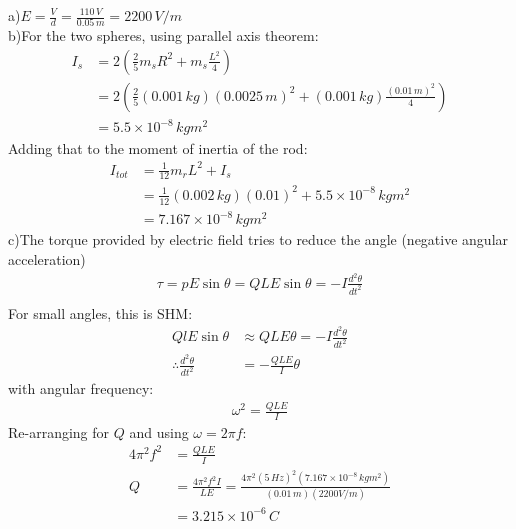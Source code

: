 \begin{solution}
a)$E=\frac{V}{d}=\frac{110\,V}{0.05\,m}=2200\,V/m$\\
b)For the two spheres, using parallel axis theorem:
\begin{align*}
I_s&=2 \left(\frac{2}{5}m_s R^2+m_s \frac{L^2}{4}\right)\\
&=2\left(\frac{2}{5}(0.001\,kg) (0.0025\,m)^2+(0.001\,kg) \frac{(0.01\,m)^2}{4}\right)\\
&=5.5\times 10^{-8}\,kg m^2
\end{align*}
Adding that to the moment of inertia of the rod:
\begin{align*}
I_{tot}&=\frac{1}{12}m_r L^2+I_s\\
&=\frac{1}{12}(0.002\,kg) (0.01)^2+5.5\times 10^{-8}\,kg m^2\\
&=7.167\times 10^{-8}\,kg m^2
\end{align*}
c)The torque provided by electric field tries to reduce the angle (negative angular acceleration)
\begin{align*}
\tau = pE\sin\theta = QLE\sin\theta = - I\frac{d^2\theta}{dt^2}\\
\end{align*}
For small angles, this is SHM:
\begin{align*}
QlE\sin\theta &\approx QLE\theta = -I\frac{d^2\theta}{dt^2}\\
\therefore \frac{d^2\theta}{dt^2}&=-\frac{QLE}{I}\theta
\end{align*}
with angular frequency:
\begin{align*}
\omega^2=\frac{QLE}{I}
\end{align*}
Re-arranging for $Q$ and using $\omega=2\pi f$:
\begin{align*}
4\pi^2 f^2&=\frac{QLE}{I}\\
Q &= \frac{4\pi^2 f^2 I}{LE}=\frac{4\pi^2 (5\,Hz)^2 (7.167\times 10^{-8}\,kg m^2)}{(0.01\,m)(2200V/m)}\\
&=3.215 \times 10^{-6}\,C
\end{align*}
\end{solution}

